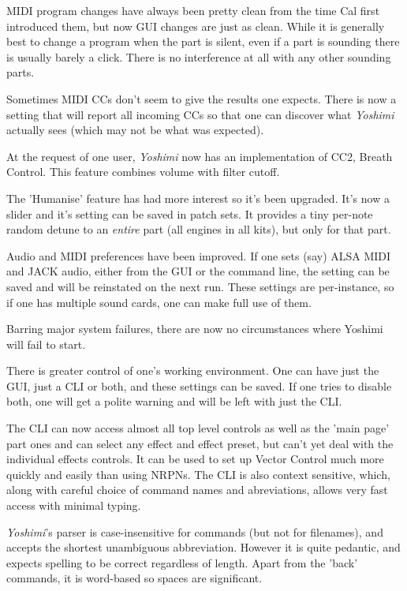 \documentclass[
 11pt,
 twoside,
 a4paper,
 final                                 %
]{article}
\begin{document}
   MIDI program changes have always been pretty clean from the time Cal first
   introduced them, but now GUI changes are just as clean. While it is
   generally best to change a program when the part is silent, even if a part
   is sounding there is usually barely a click. There is no interference at all
   with any other sounding parts.

   Sometimes MIDI CCs don't seem to give the results one expects. There is
   now a setting that will report all incoming CCs so that one can discover
   what \textsl{Yoshimi} actually sees (which may not be what was expected).

   At the request of one user, \textsl{Yoshimi} now has an
   implementation of CC2, Breath Control.
   This feature combines volume with
   filter cutoff.

   The 'Humanise' feature has had more interest so it's been upgraded. It's now
   a slider and it's setting can be saved in patch sets. It provides a tiny
   per-note random detune to an \textsl{entire} part (all engines in all kits),
   but only for that part.

   Audio and MIDI preferences have been improved. If one sets (say) ALSA MIDI
   and JACK audio, either from the GUI or the command line, the setting can be
   saved and will be reinstated on the next run. These settings are
   per-instance, so if one has multiple sound cards, one can make full use of
   them.

   Barring major system failures, there are now no circumstances where Yoshimi
   will fail to start.

   There is greater control of one's working environment. One can have just the
   GUI, just a CLI or both, and these settings can be saved. If one tries to
   disable both, one will get a polite warning and will be left with just the
   CLI.

   The CLI can now access almost all top level controls as well as the 'main
   page' part ones and can select any effect and effect preset, but can't yet
   deal with the individual effects controls. It can be used to set up Vector
   Control much more quickly and easily than using NRPNs.  The CLI is also
   context sensitive, which, along with careful choice of command names and
   abreviations, allows very fast access with minimal typing.

   \textsl{Yoshimi}'s parser is case-insensitive for commands (but not for
   filenames), and accepts the shortest unambiguous abbreviation. However it is
   quite pedantic, and expects spelling to be correct regardless of length.
   Apart from the 'back' commands, it is word-based so spaces are significant.
\end{document}
